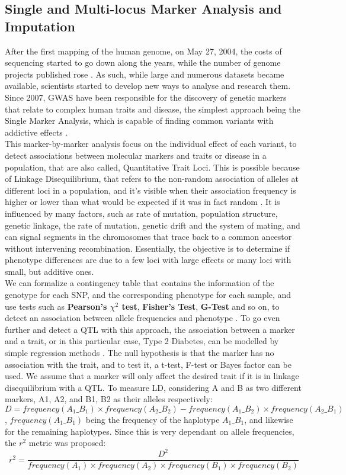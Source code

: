\subsection{Single and Multi-locus Marker Analysis and Imputation}
After the first mapping of the human genome, on May 27, 2004, the costs of sequencing started to go down along the years, while the number of genome projects published rose \cite{schmutz2004quality}. 
As such, while large and numerous datasets became available, scientists started to develop new ways to analyse and research them. Since 2007, GWAS have been responsible for the discovery of genetic markers that relate to complex human traits and disease, the simplest approach being the Single Marker Analysis, which is capable of finding common variants with addictive effects \cite{scott2007genome}.\\ 
This marker-by-marker analysis focus on the individual effect of each variant, to detect associations between molecular markers and traits or disease in a population, that are also called, Quantitative Trait Loci. This is possible because of Linkage Disequilibrium, that refers to the non-random association of alleles at different loci in a population, and it's visible when their association frequency is higher or lower than what would be expected if it was in fact random \cite{slatkin2008linkage}. It is influenced by many factors, such as rate of mutation, population structure, genetic linkage, the rate of mutation, genetic drift and the system of mating, and can signal segments in the chromosomes that trace back to a common ancestor without intervening recombination. Essentially, the objective is to determine if phenotype differences are due to a few loci with large effects or many loci with small, but additive ones.  \\
We can formalize a contingency table that contains the information of the genotype for each SNP, and the corresponding phenotype for each sample, and use tests such as \textbf{Pearson's $\chi^2$ test}, \textbf{Fisher's Test}, \textbf{G-Test} and so on, to detect an association between allele frequencies and phenotype \cite{zhang2012mining}.
To go even further and detect a QTL with this approach, the association between a marker and a trait, or in this particular case, Type 2 Diabetes, can be modelled by simple regression methods \cite{haley1992simple}. 
The null hypothesis is that the marker has no association with the trait, and to test it, a t-test, F-test or Bayes factor can be used. We assume that a marker will only affect the desired trait if it is in linkage disequilibrium with a QTL. To measure LD, considering A and B as two different markers, A1, A2, and B1, B2 as their alleles respectively:\[D = frequency(A_1\_B_1)\times frequency(A_2\_B_2) - frequency(A_1\_B_2)\times frequency(A_2\_B_1)\], $frequency(A_1\_B_1)$ being the frequency of the haplotype $A_1\_B_1$, and likewise for the remaining haplotypes. Since this is very dependant on allele frequencies, the $r^2$ metric was proposed:\[r^2 = \frac{D^2}{frequency(A_1)\times frequency(A_2)\times frequency(B_1)\times frequency(B_2)}\]\\
